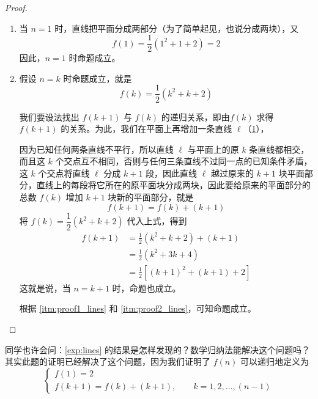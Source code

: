 \begin{proof}
\begin{enumerate}
    \item\label{itm:proof1_lines} 当 $n=1$ 时，直线把平面分成两部分（为了简单起见，也说分成两块），又
  \[f(1)=\frac{1}{2}(1^2+1+2)=2\]
    因此，$n=1$ 时命题成立。
   \item\label{itm:proof2_lines} 假设 $n=k$ 时命题成立，就是
\[f(k)=\frac{1}{2}(k^2+k+2)\]

我们要设法找出 $f(k+1)$ 与 $f(k)$ 的递归关系，即由$f(k)$ 求得 $f(k+1)$ 的关系。为此，我们在平面上再增加一条直线 $\ell$（\cref{fig:lines}），
\begin{figure}
  \caption{}\label{fig:lines}
\end{figure}
因为已知任何两条直线不平行，所以直线 $\ell$ 与平面上的原 $k$ 条直线都相交，而且这 $k$ 个交点互不相同，否则与任何三条直线不过同一点的已知条件矛盾，这 $k$ 个交点将直线 $\ell$ 分成 $k+1$ 段，因此直线 $\ell$ 越过原来的 $k+1$ 块平面部分，直线上的每段将它所在的原平面块分成两块，因此要给原来的平面部分的总数 $f(k)$ 增加 $k+1$ 块新的平面部分，就是
\[f(k+1)=f(k)+(k+1)\]
将 $f(k)=\dfrac{1}{2}(k^2+k+2)$ 代入上式，得到
\[\begin{split}
    f(k+1)&=\frac{1}{2}(k^2+k+2)+(k+1)\\
    &=\frac{1}{2}(k^2+3k+4)\\
    &=\frac{1}{2}[(k+1)^2+(k+1)+2]
\end{split}\]
这就是说，当 $n=k+1$ 时，命题也成立。



根据 \ref{itm:proof1_lines} 和 \ref{itm:proof2_lines}，可知命题成立。
\end{enumerate}
\end{proof}

同学也许会问：\cref{exp:lines} 的结果是怎样发现的？数学归纳法能解决这个问题吗？其实此题的证明已经解决了这个问题，因为我们证明了 $f(n)$ 可以递归地定义为
\[\begin{cases}
    f(1)=2\\
    f(k+1)=f(k)+(k+1),\qquad k=1,2,\ldots,(n-1)
\end{cases}\]

